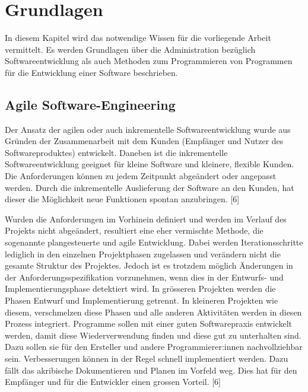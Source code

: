 
\section{Grundlagen}
In diesem Kapitel wird das notwendige Wissen für die vorliegende Arbeit vermittelt. Es werden Grundlagen über die Administration bezüglich Softwareentwicklung als auch Methoden zum Programmieren von Programmen für die Entwicklung einer Software beschrieben.\\

\subsection{Agile Software-Engineering}
Der Ansatz der agilen oder auch inkrementelle Softwareentwicklung wurde aus Gründen der Zusammenarbeit mit dem Kunden (Empfänger und Nutzer des Softwareproduktes) entwickelt. Daneben ist die inkrementelle Softwareentwicklung geeignet für kleine Software und kleinere, flexible Kunden. Die Anforderungen können zu jedem Zeitpunkt abgeändert oder angepasst werden. Durch die inkrementelle Auslieferung der Software an den Kunden, hat dieser die Möglichkeit neue Funktionen spontan anzubringen. [6]

Wurden die Anforderungen im Vorhinein definiert und werden im Verlauf des Projekts nicht abgeändert, resultiert eine eher vermischte Methode, die sogenannte plangesteuerte und agile Entwicklung. Dabei werden Iterationsschritte lediglich in den einzelnen Projektphasen zugelassen und verändern nicht die gesamte Struktur des Projektes. Jedoch ist es trotzdem möglich Änderungen in der Anforderungsspezifikation vorzunehmen, wenn dies in der Entwurfs- und Implementierungsphase detektiert wird. In grösseren Projekten werden die Phasen Entwurf und Implementierung getrennt. In kleineren Projekten wie diesem, verschmelzen diese Phasen und alle anderen Aktivitäten werden in diesen Prozess integriert. Programme sollen mit einer guten Softwarepraxis entwickelt werden, damit diese Wiederverwendung finden und diese gut zu unterhalten sind. Dazu sollen sie für den Ersteller und andere Programmierer:innen nachvollziehbar sein.
Verbesserungen können in der Regel schnell implementiert werden. Dazu fällt das akribische Dokumentieren und Planen im Vorfeld weg. Dies hat für den Empfänger und für die Entwickler einen grossen Vorteil. [6] %

